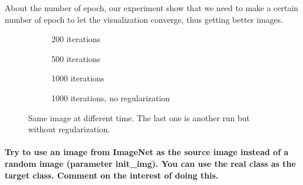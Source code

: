 About the number of epoch, our experiment show that we need to make a certain number of epoch to let the visualization converge, thus getting better images.
\begin{figure}[H]
    \centering
    \begin{subfigure}[t]{.25\textwidth}
        \centering
        \caption{200 iterations}
        \label{fig:class_viz_iter:sub1}
    \end{subfigure}%
    \begin{subfigure}[t]{.25\textwidth}
        \centering
        \caption{500 iterations}
        \label{fig:class_viz_iter:sub2}
    \end{subfigure}%
    \begin{subfigure}[t]{.25\textwidth}
        \centering
        \caption{1000 iterations}
        \label{fig:class_viz_iter:sub3}
    \end{subfigure}%
    \begin{subfigure}[t]{.25\textwidth}
        \centering
        \caption{1000 iterations, no regularization}
        \label{fig:class_viz_iter:sub4}
    \end{subfigure}

    \caption{Same image at different time. The last one is another run but without regularization.}
    \label{fig:class_viz_iter}
\end{figure}

\paragraph*{Try to use an image from ImageNet as the source image instead of a random image (parameter init\_img). You can use the real class as the target class. Comment on the interest of doing this.}

